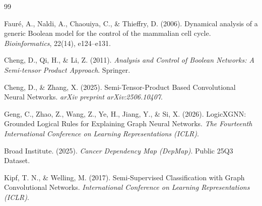 \documentclass[11pt, letterpaper]{article}
\begin{document}
	\begin{thebibliography}{99}
		
		Fauré, A., Naldi, A., Chaouiya, C., \& Thieffry, D. (2006).
		\newblock Dynamical analysis of a generic Boolean model for the control of the mammalian cell cycle.
		\newblock \emph{Bioinformatics}, 22(14), e124--e131.
		
		Cheng, D., Qi, H., \& Li, Z. (2011).
		\newblock \emph{Analysis and Control of Boolean Networks: A Semi-tensor Product Approach}.
		\newblock Springer.
		
		Cheng, D., \& Zhang, X. (2025).
		\newblock Semi-Tensor-Product Based Convolutional Neural Networks.
		\newblock \emph{arXiv preprint arXiv:2506.10407}.
		
		Geng, C., Zhao, Z., Wang, Z., Ye, H., Jiang, Y., \& Si, X. (2026).
		\newblock LogicXGNN: Grounded Logical Rules for Explaining Graph Neural Networks.
		\newblock \emph{The Fourteenth International Conference on Learning Representations (ICLR)}.
		
		Broad Institute. (2025).
		\newblock \emph{Cancer Dependency Map (DepMap)}.
		\newblock Public 25Q3 Dataset.
		
		Kipf, T. N., \& Welling, M. (2017).
		\newblock Semi-Supervised Classification with Graph Convolutional Networks.
		\newblock \emph{International Conference on Learning Representations (ICLR)}.
		
	\end{thebibliography}
\end{document}
